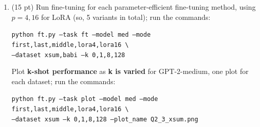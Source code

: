 \documentclass[12pt]{article}
\begin{document}
\begin{enumerate}
    \item (15 pt) Run fine-tuning for each parameter-efficient fine-tuning method, using $p=4,16$ for LoRA (so, 5 variants in total); run the commands:

    {\small \texttt{python ft.py --task ft --model med --mode first,last,middle,lora4,lora16 \textbackslash \\
    \phantom{asdf}--dataset xsum,babi --k 0,1,8,128}}

    Plot \textbf{k-shot performance} as \textbf{k is varied} for GPT-2-medium, one plot for each dataset; run the commands:

    {\small \texttt{python ft.py --task plot --model med --mode first,last,middle,lora4,lora16 \textbackslash \\
    \phantom{asdf}--dataset xsum --k 0,1,8,128 --plot\_name Q2\_3\_xsum.png}}


\end{enumerate}
\end{document}
